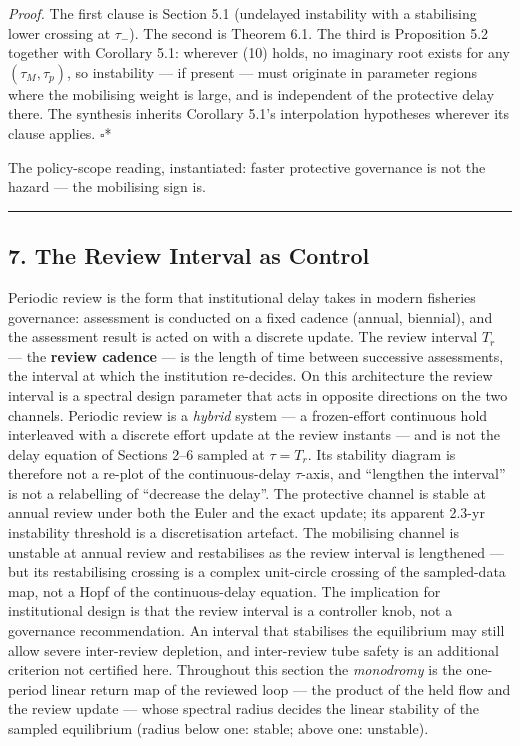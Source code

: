 \documentclass[11pt]{article}
\begin{document}
\emph{Proof.} The first clause is Section 5.1 (undelayed instability
with a stabilising lower crossing at \(\tau_-\)). The second is Theorem
6.1. The third is Proposition 5.2 together with Corollary 5.1: wherever
(10) holds, no imaginary root exists for any \((\tau_M, \tau_p)\), so
instability --- if present --- must originate in parameter regions where
the mobilising weight is large, and is independent of the protective
delay there. The synthesis inherits Corollary 5.1's interpolation
hypotheses wherever its clause applies. \ensuremath{\square}*

The policy-scope reading, instantiated: faster protective governance is
not the hazard --- the mobilising sign is.

\begin{center}\rule{0.5\linewidth}{0.5pt}\end{center}

\subsection{7. The Review Interval as
Control}\label{the-review-interval-as-control}

Periodic review is the form that institutional delay takes in modern
fisheries governance: assessment is conducted on a fixed cadence
(annual, biennial), and the assessment result is acted on with a
discrete update. The review interval \(T_r\) --- the \textbf{review
cadence} --- is the length of time between successive assessments, the
interval at which the institution re-decides. On this architecture the
review interval is a spectral design parameter that acts in opposite
directions on the two channels. Periodic review is a \emph{hybrid}
system --- a frozen-effort continuous hold interleaved with a discrete
effort update at the review instants --- and is not the delay equation
of Sections 2--6 sampled at \(\tau = T_r\). Its stability diagram is
therefore not a re-plot of the continuous-delay \(\tau\)-axis, and
``lengthen the interval'' is not a relabelling of ``decrease the
delay''. The protective channel is stable at annual review under both
the Euler and the exact update; its apparent 2.3-yr instability
threshold is a discretisation artefact. The mobilising channel is
unstable at annual review and restabilises as the review interval is
lengthened --- but its restabilising crossing is a complex unit-circle
crossing of the sampled-data map, not a Hopf of the continuous-delay
equation. The implication for institutional design is that the review
interval is a controller knob, not a governance recommendation. An
interval that stabilises the equilibrium may still allow severe
inter-review depletion, and inter-review tube safety is an additional
criterion not certified here. Throughout this section the
\emph{monodromy} is the one-period linear return map of the reviewed
loop --- the product of the held flow and the review update --- whose
spectral radius decides the linear stability of the sampled equilibrium
(radius below one: stable; above one: unstable).
\end{document}
